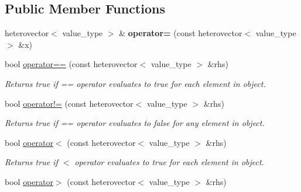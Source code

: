 \subsection*{Public Member Functions}
\begin{DoxyCompactItemize}
\item 
\hypertarget{classheterogeneous_1_1heterovector_3_01_t_01_4_ac8ad5c5bfe3239ec7d435c0a5da6b746}{}heterovector$<$ value\+\_\+type $>$ \& {\bfseries operator=} (const heterovector$<$ value\+\_\+type $>$ \&x)\label{classheterogeneous_1_1heterovector_3_01_t_01_4_ac8ad5c5bfe3239ec7d435c0a5da6b746}

\item 
\hypertarget{classheterogeneous_1_1heterovector_3_01_t_01_4_ad2411d5a7b4bc24cfd74c9385dc31ec3}{}bool \hyperlink{classheterogeneous_1_1heterovector_3_01_t_01_4_ad2411d5a7b4bc24cfd74c9385dc31ec3}{operator==} (const heterovector$<$ value\+\_\+type $>$ \&rhs)\label{classheterogeneous_1_1heterovector_3_01_t_01_4_ad2411d5a7b4bc24cfd74c9385dc31ec3}

\begin{DoxyCompactList}\small\item\em Returns true if == operator evaluates to true for each element in object. \end{DoxyCompactList}\item 
\hypertarget{classheterogeneous_1_1heterovector_3_01_t_01_4_a4bd5954785ffef4177f5d6086fde6ea3}{}bool \hyperlink{classheterogeneous_1_1heterovector_3_01_t_01_4_a4bd5954785ffef4177f5d6086fde6ea3}{operator!=} (const heterovector$<$ value\+\_\+type $>$ \&rhs)\label{classheterogeneous_1_1heterovector_3_01_t_01_4_a4bd5954785ffef4177f5d6086fde6ea3}

\begin{DoxyCompactList}\small\item\em Returns true if == operator evaluates to false for any element in object. \end{DoxyCompactList}\item 
\hypertarget{classheterogeneous_1_1heterovector_3_01_t_01_4_a9a6a4f49a2e2b6156545792875ba3b71}{}bool \hyperlink{classheterogeneous_1_1heterovector_3_01_t_01_4_a9a6a4f49a2e2b6156545792875ba3b71}{operator$<$} (const heterovector$<$ value\+\_\+type $>$ \&rhs)\label{classheterogeneous_1_1heterovector_3_01_t_01_4_a9a6a4f49a2e2b6156545792875ba3b71}

\begin{DoxyCompactList}\small\item\em Returns true if $<$ operator evaluates to true for each element in object. \end{DoxyCompactList}\item 
\hypertarget{classheterogeneous_1_1heterovector_3_01_t_01_4_a541e9825eaba04c151e10a68436b79bb}{}bool \hyperlink{classheterogeneous_1_1heterovector_3_01_t_01_4_a541e9825eaba04c151e10a68436b79bb}{operator$>$} (const heterovector$<$ value\+\_\+type $>$ \&rhs)\label{classheterogeneous_1_1heterovector_3_01_t_01_4_a541e9825eaba04c151e10a68436b79bb}


\end{DoxyCompactItemize}
